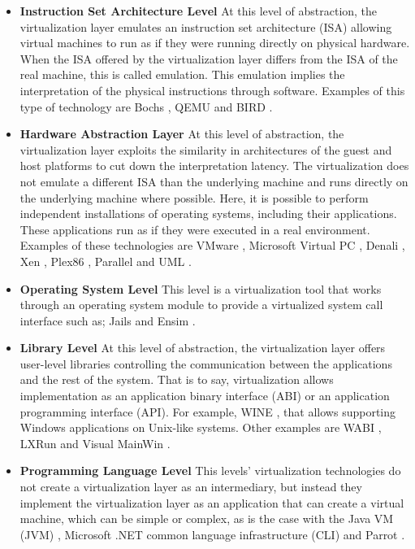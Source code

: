 	\begin{itemize}
	\item\textbf{Instruction Set Architecture Level} 
	At this level of abstraction, the virtualization layer emulates an instruction set architecture (ISA) allowing virtual machines to run as if they were running directly on physical hardware. When the ISA offered by the virtualization layer differs from the ISA of the real machine, this is called emulation.   This emulation implies the interpretation of the physical instructions through software. Examples of this type of technology are Bochs \cite{Bochs2018}, QEMU \cite {QEMU2018} and BIRD \cite {Nanda2006}.
	
	\item\textbf{Hardware Abstraction Layer}
	At this level of abstraction, the virtualization layer exploits the similarity in architectures of the guest and host platforms to cut down
the interpretation latency. The virtualization does not emulate a different ISA than the underlying machine and runs directly on the underlying machine where possible.  Here, it is possible to perform independent installations of operating systems, including their applications. These applications run as if they were executed in a real environment. Examples of these technologies are VMware \cite{VMware2018Website}, Microsoft Virtual PC \cite{Honeycutt2003}, Denali \cite {Whitaker2002}, Xen \cite{Xen2018Website, Barham2003, Xen2018WebsiteCambridge}, Plex86 \cite{Plex86}, Parallel \cite{Parallels2018} and UML \cite{Dike2006, UML2006Website}. 
	
	\item \textbf{Operating System Level}
	This level is a virtualization tool that works through an operating system module to provide a virtualized system call interface  such as; Jails \cite{Biederman2006} and Ensim \cite{Ensim}.
	
	\item\textbf{Library Level}
	At this level of abstraction, the virtualization layer offers user-level libraries controlling the communication between the applications and the rest of the system. 
	That is to say, virtualization allows implementation as  an application binary interface (ABI) or an application programming interface (API). 
	For example, WINE \cite{Wine}, that allows supporting Windows applications on Unix-like systems. 
	Other examples are WABI \cite{WABI}, LXRun \cite{LXRUN} and Visual MainWin \cite{Fisher2006}.

	\item\textbf{Programming Language Level}
	This levels' virtualization technologies do not create a virtualization layer as an intermediary, but instead they implement the virtualization layer as an application that can create a virtual machine, which can be simple or complex, as is the case with the Java VM  (JVM) \cite{Lindholm1997}, Microsoft .NET common language infrastructure (CLI) \cite{Thai2003} and Parrot \cite {Parrot}. 
	
	\end{itemize}
	
